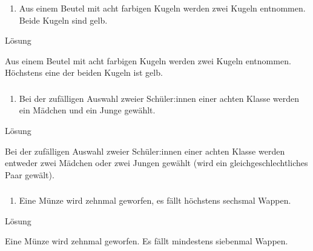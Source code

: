 \documentclass[
  ngerman,
]{book}
\providecommand{\tightlist}{%
  \setlength{\itemsep}{0pt}\setlength{\parskip}{0pt}}
\begin{document}
\hypertarget{section-164}{%
\subsubsection*{}\label{section-164}}

\begin{enumerate}
\def\labelenumi{\alph{enumi})}
\setcounter{enumi}{4}
\tightlist
\item
  Aus einem Beutel mit acht farbigen Kugeln werden zwei Kugeln entnommen. Beide Kugeln sind gelb.
\end{enumerate}

Lösung

Aus einem Beutel mit acht farbigen Kugeln werden zwei Kugeln entnommen. Höchstens eine der beiden Kugeln ist gelb.

\hypertarget{section-165}{%
\subsubsection*{}\label{section-165}}

\begin{enumerate}
\def\labelenumi{\alph{enumi})}
\setcounter{enumi}{5}
\tightlist
\item
  Bei der zufälligen Auswahl zweier Schüler:innen einer achten Klasse werden ein Mädchen und ein Junge gewählt.
\end{enumerate}

Lösung

Bei der zufälligen Auswahl zweier Schüler:innen einer achten Klasse werden entweder zwei Mädchen oder zwei Jungen gewählt (wird ein gleichgeschlechtliches Paar gewält).

\hypertarget{section-166}{%
\subsubsection*{}\label{section-166}}

\begin{enumerate}
\def\labelenumi{\alph{enumi})}
\setcounter{enumi}{6}
\tightlist
\item
  Eine Münze wird zehnmal geworfen, es fällt höchstens sechsmal Wappen.
\end{enumerate}

Lösung

Eine Münze wird zehnmal geworfen. Es fällt mindestens siebenmal Wappen.
\end{document}
